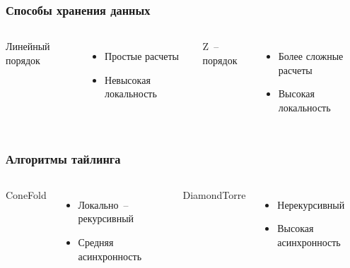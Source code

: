 \documentclass[presentation,18pt]{beamer}
\begin{document}
\begin{frame}[t]
	\label{data-order}
	\frametitle{Способы хранения данных}

	\begin{columns}

		\begin{alertblock}{Линейный порядок}
			\vspace{120pt}
		\end{alertblock}

		\begin{itemize}
			\item Простые расчеты
			\item Невысокая локальность
		\end{itemize}


		\begin{alertblock}{Z~-- порядок}
			\vspace{120pt}
		\end{alertblock}

		\begin{itemize}
			\item Более сложные расчеты
			\item Высокая локальность
		\end{itemize}

	\end{columns}
\end{frame}

\begin{frame}[t]
	\label{tiling}
	\frametitle{Алгоритмы тайлинга}

	\begin{columns}

	\column{0.4\textwidth}
		\begin{alertblock}{ConeFold}
			\vspace{120pt}
		\end{alertblock}

		\begin{itemize}
			\item Локально~-- рекурсивный
			\item Средняя асинхронность
		\end{itemize}

	\column{0.1\textwidth}

	\column{0.4\textwidth}
		\begin{alertblock}{DiamondTorre}
			\vspace{120pt}
		\end{alertblock}

		\begin{itemize}
			\item Нерекурсивный
			\item Высокая асинхронность
		\end{itemize}

	\end{columns}
\end{frame}
\end{document}
